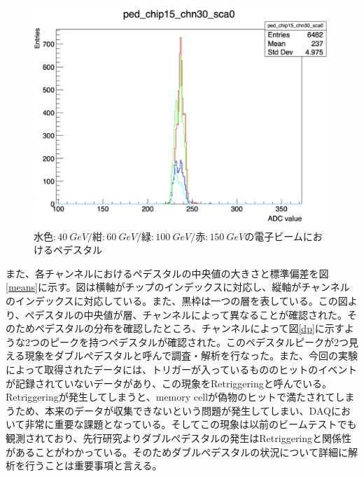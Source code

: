 \begin{figure}[H]
\begin{center}
 \includegraphics[keepaspectratio, scale=0.3]
 	{Figure/Beamtest/pedestal.png}
 		\caption{$水色: \SI{40}{GeV}/紺: \SI{60}{GeV}/緑: \SI{100}{GeV}/赤: \SI{150}{GeV}$の電子ビームにおけるペデスタル}
		\label{pedestal}
\end{center}
\end{figure}
また、各チャンネルにおけるペデスタルの中央値の大きさと標準偏差を図\ref{means}に示す。図は横軸がチップのインデックスに対応し、縦軸がチャンネルのインデックスに対応している。また、黒枠は一つの層を表している。この図より、ペデスタルの中央値が層、チャンネルによって異なることが確認された。そのためぺデスタルの分布を確認したところ、チャンネルによって図\ref{dp}に示すような2つのピークを持つペデスタルが確認された。このペデスタルピークが2つ見える現象をダブルぺデスタルと呼んで調査・解析を行なった。また、今回の実験によって取得されたデータには、トリガーが入っているもののヒットのイベントが記録されていないデータがあり、この現象をRetriggeringと呼んでいる。Retriggeringが発生してしまうと、memory cellが偽物のヒットで満たされてしまうため、本来のデータが収集できないという問題が発生してしまい、DAQにおいて非常に重要な課題となっている。そしてこの現象は以前のビームテストでも観測されており、先行研究よりダブルぺデスタルの発生はRetriggeringと関係性があることがわかっている。そのためダブルぺデスタルの状況について詳細に解析を行うことは重要事項と言える。\\


